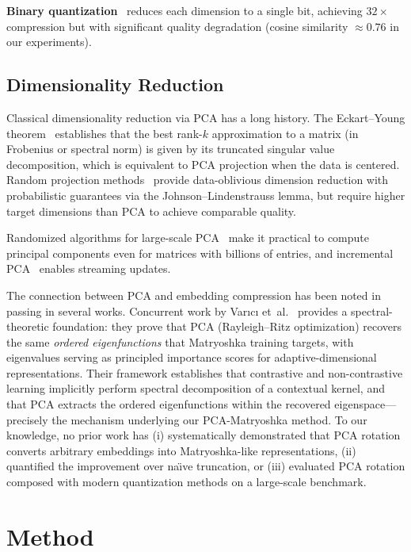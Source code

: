 \documentclass[journal]{IEEEtran}
\begin{document}
\textbf{Binary quantization}~\cite{yagnik2011power} reduces each dimension to a single bit, achieving $32\times$ compression but with significant quality degradation (cosine similarity $\approx 0.76$ in our experiments).

\subsection{Dimensionality Reduction}

Classical dimensionality reduction via PCA has a long history.
The Eckart--Young theorem~\cite{eckart1936approximation} establishes that the best rank-$k$ approximation to a matrix (in Frobenius or spectral norm) is given by its truncated singular value decomposition, which is equivalent to PCA projection when the data is centered.
Random projection methods~\cite{johnson1984extensions,achlioptas2003database} provide data-oblivious dimension reduction with probabilistic guarantees via the Johnson--Lindenstrauss lemma, but require higher target dimensions than PCA to achieve comparable quality.

Randomized algorithms for large-scale PCA~\cite{halko2011finding} make it practical to compute principal components even for matrices with billions of entries, and incremental PCA~\cite{cardoso2015incremental} enables streaming updates.

The connection between PCA and embedding compression has been noted in passing in several works.
Concurrent work by Var{\i}c{\i} et~al.~\cite{varici2025eigenfunction} provides a spectral-theoretic foundation: they prove that PCA (Rayleigh--Ritz optimization) recovers the same \emph{ordered eigenfunctions} that Matryoshka training targets, with eigenvalues serving as principled importance scores for adaptive-dimensional representations.
Their framework establishes that contrastive and non-contrastive learning implicitly perform spectral decomposition of a contextual kernel, and that PCA extracts the ordered eigenfunctions within the recovered eigenspace---precisely the mechanism underlying our PCA-Matryoshka method.
To our knowledge, no prior work has (i) systematically demonstrated that PCA rotation converts arbitrary embeddings into Matryoshka-like representations, (ii) quantified the improvement over na\"{\i}ve truncation, or (iii) evaluated PCA rotation composed with modern quantization methods on a large-scale benchmark.


\section{Method}
\label{sec:method}
\end{document}
